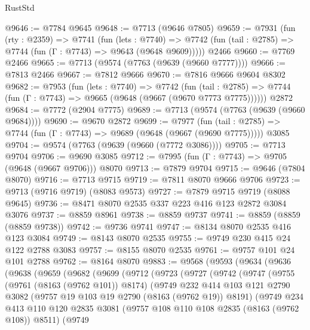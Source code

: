 \begin{lexlean}{RustStd}
\begin{coremodule}
@9646 := @7784 @9645
@9648 := @7713 (@9646 @7805)
@9659 := @7931
    (fun (rty : @2359) =>
    @7741
      (fun (lets : @7740) =>
      @7742 (fun (tail : @2785) => @7744 (fun (Γ : @7743) => @9643 (@9648 @9609)))))
    @2466
@9660 := @7769 @2466
@9665 := @7713 (@9574 (@7763 (@9639 (@9660 @7777))))
@9666 := @7813 @2466
@9667 := @7812 @9666
@9670 := @7816 @9666 @9604 @8302
@9682 := @7953
    (fun (lets : @7740) =>
    @7742
      (fun (tail : @2785) => @7744 (fun (Γ : @7743) => @9665 (@9648 (@9667 (@9670 @7773 @7775))))))
    @2872
@9684 := @7772 (@2904 @7775)
@9689 := @7713 (@9574 (@7763 (@9639 (@9660 @9684))))
@9690 := @9670 @2872
@9699 := @7977
    (fun (tail : @2785) => @7744 (fun (Γ : @7743) => @9689 (@9648 (@9667 (@9690 @7775)))))
    @3085
@9704 := @9574 (@7763 (@9639 (@9660 (@7772 @3086))))
@9705 := @7713 @9704
@9706 := @9690 @3085
@9712 := @7995 (fun (Γ : @7743) => @9705 (@9648 (@9667 @9706))) @8070
@9713 := @7879 @9704
@9715 := @9646 (@7804 @8070)
@9716 := @7713 @9715
@9719 := @7811 @8070 @9666 @9706
@9723 := @9713 (@9716 @9719) (@8083 @9573)
@9727 := @7879 @9715 @9719 (@8088 @9645)
@9736 := @8471 @8070 @2535 @337 @223 @416 @123 @2872 @3084 @3076
@9737 := @8859 @8961
@9738 := @8859 @9737
@9741 := @8859 (@8859 (@8859 @9738))
@9742 := @9736 @9741
@9747 := @8134 @8070 @2535 @416 @123 @3084
@9749 := @8143 @8070 @2535
@9755 := @9749 @230 @415 @24 @122 @2788 @3083
@9757 := @8155 @8070 @2535
@9761 := @9757 @101 @24 @101 @2788
@9762 := @8164 @8070
@9883 := @9568
    (@9593
      (@9634
        (@9636
          (@9638
            (@9659
              (@9682
                (@9699
                  (@9712
                    (@9723
                      (@9727
                        (@9742
                          (@9747
                            (@9755
                              (@9761 (@8163 (@9762 @101)) @8174)
                              (@9749
                                @232
                                @414
                                @103
                                @121
                                @2790
                                @3082
                                (@9757 @19 @103 @19 @2790 (@8163 (@9762 @19)) @8191)
                                (@9749
                                  @234
                                  @413
                                  @110
                                  @120
                                  @2835
                                  @3081
                                  (@9757 @108 @110 @108 @2835 (@8163 (@9762 @108)) @8511)
                                  (@9749

\end{coremodule}
\end{lexlean}
